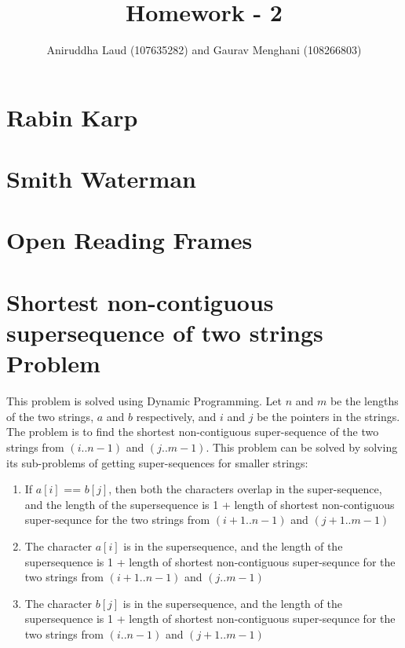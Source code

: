 \documentclass{article}
\title{Homework - 2}
\author{Aniruddha Laud (107635282) and Gaurav Menghani (108266803)}
\begin{document}
\maketitle

\clearpage

\tableofcontents

\clearpage

\section{Rabin Karp}

\clearpage

\section{Smith Waterman}
\clearpage

\section{Open Reading Frames}
\clearpage

\section{Shortest non-contiguous supersequence of two strings Problem}
This problem is solved using Dynamic Programming. Let $n$ and $m$ be the lengths of the two strings, $a$ and $b$ respectively, and $i$ and $j$ be the pointers in the strings. The problem is to find the shortest non-contiguous super-sequence of the two strings from $(i..n-1)$ and $(j..m-1)$. This problem can be solved by solving its sub-problems of getting super-sequences for smaller strings:
\begin{enumerate}
\item If $a[i]$ == $b[j]$, then both the characters overlap in the super-sequence, and the length of the supersequence is 1 + length of shortest non-contiguous super-sequnce for the two strings from $(i+1..n-1)$ and $(j+1..m-1)$
\item The character $a[i]$ is in the supersequence, and the length of the supersequence is 1 + length of shortest non-contiguous super-sequnce for the two strings from $(i+1..n-1)$ and $(j..m-1)$
\item The character $b[j]$ is in the supersequence, and the length of the supersequence is 1 + length of shortest non-contiguous super-sequnce for the two strings from $(i..n-1)$ and $(j+1..m-1)$
\end{enumerate}
\end{document}
